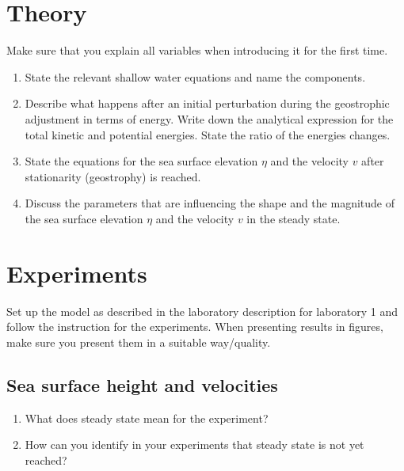 \begin{question}
\section*{Theory}

Make sure that you explain all variables when introducing it for the first time.

\begin{enumerate}

\item State the relevant shallow water equations and name the components.

\item Describe what happens after an initial perturbation during the geostrophic adjustment in terms of energy. Write down the analytical expression for the total kinetic and potential energies. State the ratio of the energies changes.

\item State the equations for the sea surface elevation $\eta$ and the velocity $v$ after stationarity (geostrophy) is reached.

\item Discuss the parameters that are influencing the shape and the magnitude of the sea surface elevation $\eta$ and the velocity $v$ in the steady state.

\end{enumerate}


\section*{Experiments}

Set up the model as described in the laboratory description for laboratory 1 and follow the instruction for the experiments. When presenting results in figures, make sure you present them in a suitable way/quality.


\subsection*{Sea surface height and velocities}

\begin{enumerate}

\item What does steady state mean for the experiment?

\item How can you identify in your experiments that steady state is not yet reached?


\end{enumerate}
\end{question}
